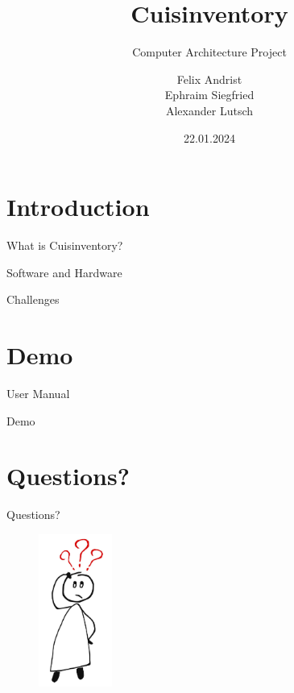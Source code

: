 \documentclass[aspectratio=169]{beamer}
\title            {Cuisinventory}
\subtitle         {Computer Architecture Project}
\author           {Felix Andrist \texorpdfstring{\\ Ephraim Siegfried \\ Alexander Lutsch}{}}
\date             {22.01.2024}
\institute        {Department of Mathematics and Computer Science}
\begin{document}
\begin{frame}[t,plain]
	\titlepage
\end{frame}

\section{Introduction}


\begin{frame}{What is Cuisinventory?}
	\blinditemize
\end{frame}

\begin{frame}{Software and Hardware}
	\blinditemize
\end{frame}

\begin{frame}{Challenges}
	\blinditemize
\end{frame}

\section{Demo}


\begin{frame}{User Manual}
	\blinditemize
\end{frame}

\begin{frame}{Demo}
	\blinditemize
\end{frame}

\section{Questions?}


\begin{frame}{Questions?}

	\begin{figure}[h]
		\centering
		\includegraphics[height=5cm]{fragen.png}
	\end{figure}

\end{frame}
\end{document}
